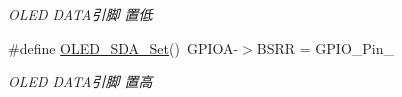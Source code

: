 \begin{DoxyCompactItemize}
\begin{DoxyCompactList}\small\item\em \-O\-L\-E\-D \-D\-A\-T\-A引脚 置低 \end{DoxyCompactList}\item 
\hypertarget{group___o_l_e_d_gac426659bc7bcd603e46ec9a208c22f13}{\#define \hyperlink{group___o_l_e_d_gac426659bc7bcd603e46ec9a208c22f13}{\-O\-L\-E\-D\-\_\-\-S\-D\-A\-\_\-\-Set}()~\-G\-P\-I\-O\-A-\/$>$\-B\-S\-R\-R = \-G\-P\-I\-O\-\_\-\-Pin\-\_}\label{group___o_l_e_d_gac426659bc7bcd603e46ec9a208c22f13}

\begin{DoxyCompactList}\small\item\em \-O\-L\-E\-D \-D\-A\-T\-A引脚 置高 \end{DoxyCompactList}\end{DoxyCompactItemize}
